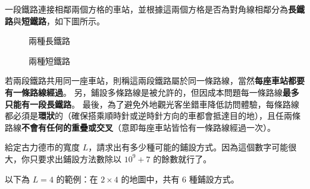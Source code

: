 一段鐵路連接相鄰兩個方格的車站，並根據這兩個方格是否為對角線相鄰分為\textbf{長鐵路}與\textbf{短鐵路}，如下圖所示。

\begin{minipage}{0.5\textwidth}
  \begin{figure}[H]
  \centering
  \caption{兩種長鐵路}
  \end{figure}
\end{minipage}
\begin{minipage}{0.5\textwidth}
  \begin{figure}[H]
  \centering
  \caption{兩種短鐵路}
  \end{figure}
\end{minipage}

若兩段鐵路共用同一座車站，則稱這兩段鐵路屬於同一條路線，當然\textbf{每座車站都要有一條路線經過}。
另，鋪設多條路線是被允許的，但因成本問題每一條路線\textbf{最多只能有一段長鐵路}。
最後，為了避免外地觀光客坐錯車降低訪問體驗，每條路線都必須是\textbf{環狀}的（確保搭乘順時針或逆時針方向的車都會抵達目的地），且任兩條路線\textbf{不會有任何的重疊或交叉}（意即每座車站皆恰有一條路線經過一次）。

給定古力德市的寬度
\begin{math}L\end{math}，請求出有多少種可能的鋪設方式。因為這個數字可能很大，你只要求出鋪設方法數除以
\begin{math}10^9+7\end{math} 的餘數就行了。

以下為 \begin{math}L = 4\end{math} 的範例：在
\begin{math}2 \times 4\end{math} 的地圖中，共有 \begin{math}6\end{math}
種鋪設方式。

